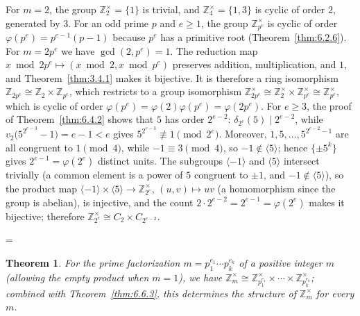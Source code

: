 \documentclass[11pt]{article}
\makeatletter
\theoremstyle{ntstyle}
\newtheorem{theorem}{Theorem}[subsection]
\let\nt@closedisplay\]
\def\nt@guardedclose{\@ifnextchar\par{\nt@closeafterpar}{\@ifnextchar\end{\postdisplaypenalty\@M\nt@closedisplay}{\nt@closedisplay}}}
\def\nt@closeafterpar\par{\@ifnextchar\par{\nt@closeafterpar}{\@ifnextchar\end{\postdisplaypenalty\@M\nt@closedisplay\par}{\nt@closedisplay\par}}}
\renewenvironment{proof}[1][\proofname]{\par
  \pushQED{\qed}\normalfont\topsep\medskipamount\edef\nt@afterproof{\@endparpenalty=\the\@endparpenalty\relax}\@beginparpenalty\@M\@endparpenalty\@M\let\]\nt@guardedclose\trivlist\item[]\textit{#1\@addpunct{.}} \ignorespaces}{\ifvmode\addpenalty\@M\fi\popQED\nt@afterproof\endtrivlist\@endpefalse}
\newcommand{\ZmodUnits}[1]{\mathbb{Z}_{#1}^{\times}}
\makeatother
\begin{document}
\begin{proof} For $m = 2$, the group $\ZmodUnits{2}
		= \{1\}$ is trivial, and $\ZmodUnits{4} = \{1, 3\}$ is cyclic of
	order $2$, generated by $3$. For an odd prime $p$ and $e \ge 1$, the
	group $\ZmodUnits{p^{e}}$ is cyclic of order $\varphi(p^{e}) =
		p^{e-1}(p-1)$ because $p^{e}$ has a primitive root (Theorem~\ref{thm:6.2.6}). For
	$m = 2p^{e}$ we have $\gcd(2, p^{e}) = 1$. The reduction map
	$x\bmod2p^e\mapsto(x\bmod2,x\bmod p^e)$ preserves addition,
	multiplication, and $1$, and Theorem~\ref{thm:3.4.1} makes it
	bijective. It is therefore a ring isomorphism
	$\mathbb{Z}_{2p^{e}} \cong \mathbb{Z}_2\times\mathbb{Z}_{p^{e}}$,
	which restricts to a group isomorphism
	$\ZmodUnits{2p^{e}} \cong \ZmodUnits{2} \times
		\ZmodUnits{p^{e}} \cong \ZmodUnits{p^{e}}$, which is
	cyclic of order $\varphi(p^{e}) = \varphi(2)\varphi(p^{e}) =
		\varphi(2p^{e})$. For $e \ge 3$, the proof of
	Theorem~\ref{thm:6.4.2} shows that $5$ has order $2^{e-2}$:
	$\delta_{2^e}(5) \mid 2^{e-2}$, while $v_2\big(5^{2^{e-3}} - 1\big) =
		e-1 < e$ gives $5^{2^{e-3}} \not\equiv 1 \pmod{2^e}$. Moreover, $1, 5,
		\ldots, 5^{2^{e-2}-1}$ are all congruent to $1 \pmod{4}$, while $-1 \equiv 3
		\pmod{4}$, so $-1 \notin \langle 5 \rangle$; hence $\{\pm 5^{k}\}$
	gives $2^{e-1} = \varphi(2^{e})$ distinct units. The subgroups
	$\langle-1\rangle$ and $\langle5\rangle$ intersect trivially (a common
	element is a power of $5$ congruent to $\pm1$, and
	$-1\notin\langle5\rangle$), so the product map
	$\langle-1\rangle\times\langle5\rangle\to\ZmodUnits{2^{e}}$,
	$(u,v)\mapsto uv$ (a homomorphism since the group is abelian), is
	injective, and the count $2\cdot2^{e-2}=2^{e-1}=\varphi(2^{e})$ makes
	it bijective; therefore
	$\ZmodUnits{2^{e}} \cong C_2 \times C_{2^{e-2}}$.

\end{proof}
\begin{theorem}\label{thm:6.6.4}
	For the prime factorization $m = p_1^{e_1} \cdots p_k^{e_k}$ of a positive integer $m$ (allowing the empty product when $m=1$), we have $\ZmodUnits{m} \cong
		\ZmodUnits{p_1^{e_1}} \times \cdots \times
		\ZmodUnits{p_k^{e_k}}$; combined with Theorem~\ref{thm:6.6.3}, this
	determines the structure of $\ZmodUnits{m}$ for every $m$.

\end{theorem}
\end{document}
